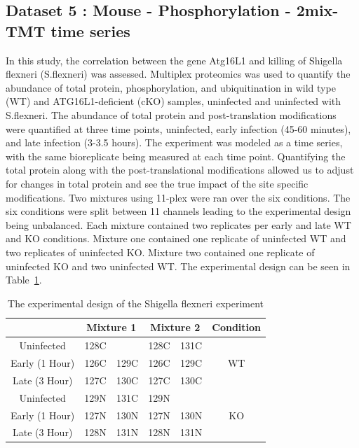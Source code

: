 \documentclass{mcp}
\begin{document}
\clearpage
\subsection{Dataset 5 : Mouse - Phosphorylation - 2mix-TMT time series}
\label{sec:shigella}

In this study, the correlation between the gene Atg16L1 and killing of Shigella flexneri (S.flexneri) was assessed. \cite{Maculins} Multiplex proteomics was used to quantify the abundance of total protein, phosphorylation, and ubiquitination in wild type (WT) and ATG16L1-deficient (cKO) samples, uninfected and uninfected with S.flexneri. The abundance of total protein and post-translation modifications were quantified at three time points, uninfected, early infection (45-60 minutes), and late infection (3-3.5 hours). The experiment was modeled as a time series, with the same bioreplicate being measured at each time point. Quantifying the total protein along with the post-translational modifications allowed us to adjust for changes in total protein and see the true impact of the site specific modifications. Two mixtures using 11-plex were ran over the six conditions. The six conditions were split between 11 channels leading to the experimental design being unbalanced. Each mixture contained two replicates per early and late WT and KO conditions. Mixture one contained one replicate of uninfected WT and two replicates of uninfected KO. Mixture two contained one replicate of uninfected KO and two uninfected WT. The experimental design can be seen in Table~\ref{table:shigella_design}.

\begin{table}[h!]
\centering
\begin{tabular}{|c | c c | c c | c|}
\hline
 & \multicolumn{2}{c}{Mixture 1} & \multicolumn{2}{c}{Mixture 2} & Condition \\ [0.5ex]
 \hline\hline
 Uninfected & 128C & & 128C & 131C & \\
 \hline
Early (1 Hour) & 126C & 129C & 126C & 129C & WT \\
\hline
Late (3 Hour) & 127C & 130C & 127C & 130C & \\
\hline
Uninfected & 129N & 131C & 129N & & \\
\hline
Early (1 Hour) & 127N & 130N & 127N & 130N & KO \\
\hline
Late (3 Hour) & 128N & 131N & 128N & 131N & \\
\hline

\end{tabular}
\caption{The experimental design of the Shigella flexneri experiment}
\label{table:shigella_design}
\end{table}
\end{document}
